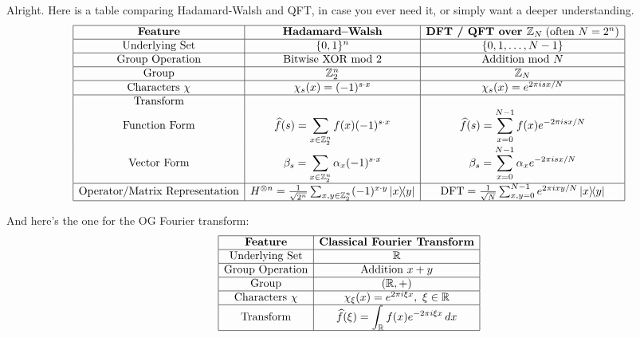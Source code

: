 Alright. Here is a table comparing Hadamard-Walsh and QFT, in case you ever need it, or simply want a deeper understanding.
\[
\begin{array}{|c|c|c|}
\hline
\textbf{Feature} 
& \textbf{Hadamard--Walsh} 
& \textbf{DFT / QFT over }\mathbb{Z}_N\; (\text{often } N=2^n) \\
\hline

\text{Underlying Set} 
& \{0,1\}^n 
& \{0,1,\dots,N-1\} \\
\hline

\text{Group Operation} 
& \text{Bitwise XOR mod 2} 
& \text{Addition mod } N \\
\hline

\text{Group} 
& \mathbb{Z}_2^n 
& \mathbb{Z}_N \\
\hline

\text{Characters } \chi 
& \chi_s(x)=(-1)^{s\cdot x} 
& \chi_s(x)=e^{2\pi i sx/N} \\
\hline

\text{Transform}
&
& \\

\text{Function Form} 
& \widehat f(s)=\displaystyle\sum_{x\in\mathbb{Z}_2^n} 
f(x)(-1)^{s\cdot x} 
& \widehat f(s)=\displaystyle\sum_{x=0}^{N-1} 
f(x)e^{-2\pi i sx/N} \\

\text{Vector Form} 
& \beta_s=\displaystyle\sum_{x\in\mathbb{Z}_2^n} 
\alpha_x(-1)^{s\cdot x} 
& \beta_s=\displaystyle\sum_{x=0}^{N-1} 
\alpha_xe^{-2\pi i sx/N} \\
\hline

\text{Operator/Matrix Representation} 
& H^{\otimes n} = \frac{1}{\sqrt{2^n}} \sum_{x,y \in \mathbb{Z}_2^n} (-1)^{x \cdot y} \ketbra{x}{y}
& \text{DFT} = \frac{1}{\sqrt{N}} \sum_{x,y=0}^{N-1} e^{2\pi ixy/N} \ketbra{x}{y} \\
\hline

\end{array}
\]

And here's the one for the OG Fourier transform:
\[
\begin{array}{|c|c|}
\hline
\textbf{Feature} 
& \textbf{Classical Fourier Transform} \\
\hline

\text{Underlying Set} 
& \mathbb{R} \\
\hline

\text{Group Operation} 
& \text{Addition } x+y \\
\hline

\text{Group} 
& (\mathbb{R}, +) \\
\hline

\text{Characters } \chi 
& \chi_\xi(x)=e^{2\pi i \xi x},\ \xi\in\mathbb{R} \\
\hline

\text{Transform} 
& \widehat f(\xi)=\displaystyle\int_{\mathbb R} 
f(x)e^{-2\pi i \xi x}\,dx \\
\hline

\end{array}
\]


